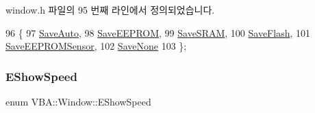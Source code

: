 window.\+h 파일의 95 번째 라인에서 정의되었습니다.


\begin{DoxyCode}
96   \{
97     \mbox{\hyperlink{class_v_b_a_1_1_window_a299f71905bca4f89a8df627dd25dafa5a40d647f47d41de9e41920bf1ae468127}{SaveAuto}},
98     \mbox{\hyperlink{class_v_b_a_1_1_window_a299f71905bca4f89a8df627dd25dafa5acc451384d38acd1d4a9fc05479dfed0f}{SaveEEPROM}},
99     \mbox{\hyperlink{class_v_b_a_1_1_window_a299f71905bca4f89a8df627dd25dafa5aa48607561580908865a6a1aa6e47624f}{SaveSRAM}},
100     \mbox{\hyperlink{class_v_b_a_1_1_window_a299f71905bca4f89a8df627dd25dafa5a0a8eb308423865ee29596a7725939d1c}{SaveFlash}},
101     \mbox{\hyperlink{class_v_b_a_1_1_window_a299f71905bca4f89a8df627dd25dafa5ab73f16a082938494a5ab9f1466970b0d}{SaveEEPROMSensor}},
102     \mbox{\hyperlink{class_v_b_a_1_1_window_a299f71905bca4f89a8df627dd25dafa5a646edadc2bc0272b5a461dd4dc681bd9}{SaveNone}}
103   \};
\end{DoxyCode}
\mbox{\label{class_v_b_a_1_1_window_a9dfcf6d1a23c7576d357221d4bedda45}} 
\subsubsection{\texorpdfstring{E\+Show\+Speed}{EShowSpeed}}
{\footnotesize\ttfamily enum V\+B\+A\+::\+Window\+::\+E\+Show\+Speed\hspace{0.3cm}{\ttfamily [protected]}}

